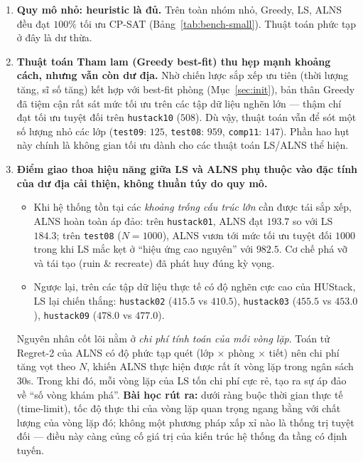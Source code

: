\begin{enumerate}[leftmargin=*]
  \item \textbf{Quy mô nhỏ: heuristic là đủ.} Trên toàn nhóm nhỏ, Greedy, LS, ALNS
  đều đạt $100\%$ tối ưu CP-SAT (Bảng~\ref{tab:bench-small}). Thuật toán phức tạp ở
  đây là dư thừa.

  \item \textbf{Thuật toán Tham lam (Greedy best-fit) thu hẹp mạnh khoảng cách,
  nhưng vẫn còn dư địa.} Nhờ chiến lược sắp xếp ưu tiên (thời lượng tăng, sĩ số
  tăng) kết hợp với best-fit phòng (Mục~\ref{sec:init}), bản thân Greedy đã tiệm cận
  rất sát mức tối ưu trên các tập dữ liệu nghẽn lớn --- thậm chí đạt tối ưu tuyệt
  đối trên \texttt{hustack10} ($508$). Dù vậy, thuật toán vẫn để sót một số lượng
  nhỏ các lớp (\texttt{test09}: $125$, \texttt{test08}: $959$, \texttt{comp11}:
  $147$). Phần hao hụt này chính là không gian tối ưu dành cho các thuật toán
  LS/ALNS thể hiện.

  \item \textbf{Điểm giao thoa hiệu năng giữa LS và ALNS phụ thuộc vào đặc tính của
  dư địa cải thiện, không thuần túy do quy mô.}
  \begin{itemize}
    \item Khi hệ thống tồn tại các \emph{khoảng trống cấu trúc lớn} cần được tái sắp
    xếp, ALNS hoàn toàn áp đảo: trên \texttt{hustack01}, ALNS đạt $193.7$ so với LS
    $184.3$; trên \texttt{test08} ($N{=}1000$), ALNS vươn tới mức tối ưu tuyệt đối
    $1000$ trong khi LS mắc kẹt ở ``hiệu ứng cao nguyên'' với $982.5$. Cơ chế phá vỡ
    và tái tạo (ruin \& recreate) đã phát huy đúng kỳ vọng.
    \item Ngược lại, trên các tập dữ liệu thực tế có độ nghẽn cực cao của HUStack,
    LS lại chiến thắng: \texttt{hustack02} ($415.5$ vs $410.5$), \texttt{hustack03}
    ($455.5$ vs $453.0$), \texttt{hustack09} ($478.0$ vs $477.0$).
  \end{itemize}
  Nguyên nhân cốt lõi nằm ở \emph{chi phí tính toán của mỗi vòng lặp}. Toán tử
  Regret-2 của ALNS có độ phức tạp quét (lớp $\times$ phòng $\times$ tiết) nên chi
  phí tăng vọt theo $N$, khiến ALNS thực hiện được rất ít vòng lặp trong ngân sách
  $30$s. Trong khi đó, mỗi vòng lặp của LS tốn chi phí cực rẻ, tạo ra sự áp đảo về
  ``số vòng khám phá''. \textbf{Bài học rút ra:} dưới ràng buộc thời gian thực tế
  (time-limit), tốc độ thực thi của vòng lặp quan trọng ngang bằng với chất lượng
  của vòng lặp đó; không một phương pháp xấp xỉ nào là thống trị tuyệt đối --- điều
  này càng củng cố giá trị của kiến trúc hệ thống đa tầng có định tuyến.


\end{enumerate}
